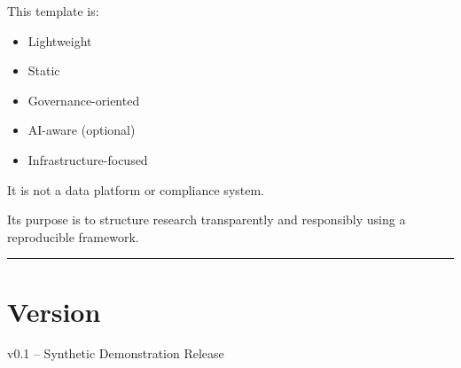 \documentclass[
]{report}
\providecommand{\tightlist}{%
  \setlength{\itemsep}{0pt}\setlength{\parskip}{0pt}}
\begin{document}
This template is:

\begin{itemize}
\tightlist
\item
  Lightweight
\item
  Static
\item
  Governance-oriented
\item
  AI-aware (optional)
\item
  Infrastructure-focused
\end{itemize}

It is not a data platform or compliance system.

Its purpose is to structure research transparently and responsibly using
a reproducible framework.

\begin{center}\rule{0.5\linewidth}{0.5pt}\end{center}

\section{Version}\label{version}

v0.1 -- Synthetic Demonstration Release
\end{document}
